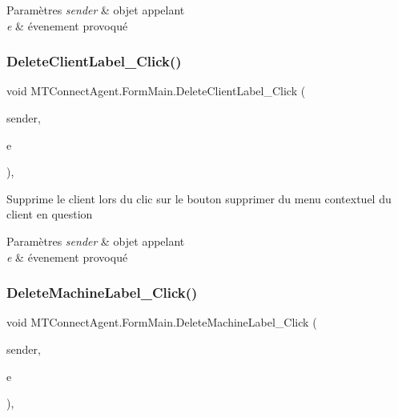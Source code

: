 \begin{DoxyParams}{Paramètres}
{\em sender} & objet appelant\\
\hline
{\em e} & évenement provoqué\\
\hline
\end{DoxyParams}
\mbox{\label{class_m_t_connect_agent_1_1_form_main_a63b6bc05b458da02b80617365163d10d}} 
\subsubsection{\texorpdfstring{Delete\+Client\+Label\+\_\+\+Click()}{DeleteClientLabel\_Click()}}
{\footnotesize\ttfamily void M\+T\+Connect\+Agent.\+Form\+Main.\+Delete\+Client\+Label\+\_\+\+Click (\begin{DoxyParamCaption}\item[{object}]{sender,  }\item[{Event\+Args}]{e }\end{DoxyParamCaption})\hspace{0.3cm}{\ttfamily [inline]}, {\ttfamily [private]}}



Supprime le client lors du clic sur le bouton supprimer du menu contextuel du client en question 


\begin{DoxyParams}{Paramètres}
{\em sender} & objet appelant\\
\hline
{\em e} & évenement provoqué\\
\hline
\end{DoxyParams}
\mbox{\label{class_m_t_connect_agent_1_1_form_main_a326e8aba114dece871aa510ce1aa495e}} 
\subsubsection{\texorpdfstring{Delete\+Machine\+Label\+\_\+\+Click()}{DeleteMachineLabel\_Click()}}
{\footnotesize\ttfamily void M\+T\+Connect\+Agent.\+Form\+Main.\+Delete\+Machine\+Label\+\_\+\+Click (\begin{DoxyParamCaption}\item[{object}]{sender,  }\item[{Event\+Args}]{e }\end{DoxyParamCaption})\hspace{0.3cm}{\ttfamily [inline]}, {\ttfamily [private]}}



